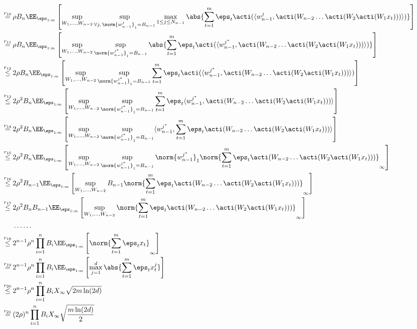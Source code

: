 \begin{align*}
  \stackrel{r_{10}}{=}\,&\rho B_n \EE_{\eps_{1:m}} \left[ \sup_{\substack{ W_1,\ldots,W_{n-2}}} \sup_{\forall j,\,\norm{w_{n-1}^{j}}_1 = B_{n-1}} \max_{1 \le j \le N_{n-1}} \abs{\sum_{t=1}^m \eps_{t} \acti(\langle w_{n-1}^j,\acti(W_{n-2} \ldots \acti(W_2\acti(W_1x_t))) \rangle )} \right] \\
  \stackrel{r_{11}}{=}\,&\rho B_n \EE_{\eps_{1:m}} \left[ \sup_{\substack{ W_1,\ldots,W_{n-2}}} \sup_{\norm{w_{n-1}^{j^*}}_1 = B_{n-1}} \abs{\sum_{t=1}^m \eps_{t} \acti(\langle w_{n-1}^{j^*},\acti(W_{n-2} \ldots \acti(W_2\acti(W_1x_t))) \rangle )} \right] \\
  \stackrel{r_{12}}{\le}\,&2 \rho B_n \EE_{\eps_{1:m}} \left[ \sup_{\substack{ W_1,\ldots,W_{n-2}}} \sup_{\norm{w_{n-1}^{j^*}}_1 = B_{n-1}} \sum_{t=1}^m \eps_{t} \acti(\langle w_{n-1}^{j^*},\acti(W_{n-2} \ldots \acti(W_2\acti(W_1x_t))) \rangle ) \right] \\
  \stackrel{r_{13}}{\le}\,&2 \rho^2 B_n \EE_{\eps_{1:m}} \left[ \sup_{\substack{ W_1,\ldots,W_{n-2}}} \sup_{\norm{w_{n-1}^{j^*}}_1 = B_{n-1}} \sum_{t=1}^m \eps_{t} \langle w_{n-1}^{j^*},\acti(W_{n-2} \ldots \acti(W_2\acti(W_1x_t))) \rangle  \right] \\
  \stackrel{r_{14}}{=}\,&2 \rho^2 B_n \EE_{\eps_{1:m}} \left[ \sup_{\substack{ W_1,\ldots,W_{n-2}}} \sup_{\norm{w_{n-1}^{j^*}}_1 = B_{n-1}} \langle w_{n-1}^{j^*}, \sum_{t=1}^m \eps_{t} \acti(W_{n-2} \ldots \acti(W_2\acti(W_1x_t))) \rangle  \right] \\
  \stackrel{r_{15}}{\le}\,&2 \rho^2 B_n \EE_{\eps_{1:m}} \left[ \sup_{\substack{ W_1,\ldots,W_{n-2}}} \sup_{\norm{w_{n-1}^{j^*}}_1 = B_{n-1}} \norm{w_{n-1}^{j^*}}_1 \norm{\sum_{t=1}^m \eps_{t} \acti(W_{n-2} \ldots \acti(W_2\acti(W_1x_t)))}_{\infty} \right] \\
  \stackrel{r_{16}}{\le}\,&2 \rho^2 B_{n-1} \EE_{\eps_{1:m}} \left[ \sup_{\substack{ W_1,\ldots,W_{n-2}}} B_{n-1} \norm{\sum_{t=1}^m \eps_{t} \acti(W_{n-2} \ldots \acti(W_2\acti(W_1x_t)))}_{\infty} \right] \\
  \stackrel{r_{17}}{\le}\,&2 \rho^2 B_{n}B_{n-1} \EE_{\eps_{1:m}} \left[ \sup_{\substack{ W_1,\ldots,W_{n-2}}} \norm{\sum_{t=1}^m \eps_{t} \acti(W_{n-2} \ldots \acti(W_2\acti(W_1x_t)))}_{\infty} \right] \\
  & \ldots \ldots \\
  \stackrel{r_{18}}{\le}\,&2^{n-1} \rho^{n} \prod_{i=1}^{n}B_{i} \EE_{\eps_{1:m}} \left[ \norm{\sum_{t=1}^m \eps_{t}x_t}_{\infty} \right] \\
  \stackrel{r_{19}}{=}\,&2^{n-1} \rho^{n} \prod_{i=1}^{n}B_{i} \EE_{\eps_{1:m}} \left[ \max_{j=1}^d \abs{\sum_{t=1}^m \eps_{t}x_t^j} \right] \\
  \stackrel{r_{20}}{\le}\,&2^{n-1} \rho^{n} \prod_{i=1}^{n}B_{i} X_{\infty}\sqrt{2m\ln(2d)} \\
  \stackrel{r_{21}}{=}\,&(2\rho)^{n} \prod_{i=1}^{n}B_{i} X_{\infty}\sqrt{\frac{m\ln(2d)}{2}} 
\end{align*}

